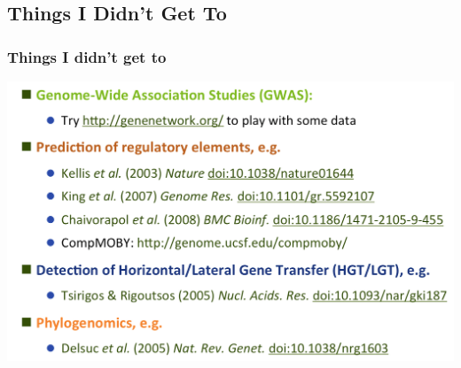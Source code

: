 
\subsection{Things I Didn't Get To}

\begin{frame}
  \frametitle{Things I didn't get to}
  \begin{center}
      \includegraphics[width=1\textwidth]{images/didnt_get_to} 
  \end{center}
\end{frame}
